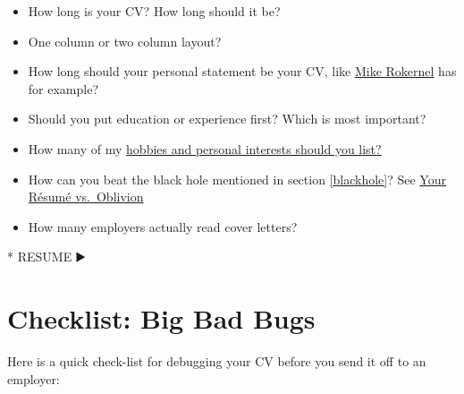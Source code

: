 \documentclass[
]{book}
\newenvironment{Shaded}{\begin{snugshade}}{\end{snugshade}}
\newcommand{\NormalTok}[1]{#1}
\newcommand{\SpecialStringTok}[1]{\textcolor[rgb]{0.31,0.60,0.02}{#1}}
\providecommand{\tightlist}{%
  \setlength{\itemsep}{0pt}\setlength{\parskip}{0pt}}
\begin{document}
\begin{itemize}
\tightlist
\item
  How long is your CV? How long should it be?
\item
  One column or two column layout?
\item
  How long should your personal statement be your CV, like \href{https://www.cdyf.me/Mike_Rokernel.pdf}{Mike Rokernel} has for example?
\item
  Should you put education or experience first? Which is most important?
\item
  How many of my \href{https://www.reed.co.uk/career-advice/hobbies-and-interests-should-i-include-them-in-my-cv}{hobbies and personal interests should you list?} \citep{hobbies}
\item
  How can you beat the black hole mentioned in section \ref{blackhole}? See \href{https://www.wsj.com/articles/SB10001424052970204624204577178941034941330}{Your Résumé vs.~Oblivion} \citep{oblivion}
\item
  How many employers actually read cover letters?
\end{itemize}

\begin{Shaded}
\begin{Highlighting}[]
\SpecialStringTok{* }\NormalTok{RESUME ▶️}
\end{Highlighting}
\end{Shaded}

\hypertarget{checklist}{%
\section{Checklist: Big Bad Bugs}\label{checklist}}

Here is a quick check-list for debugging your CV before you send it off to an employer:
\end{document}
